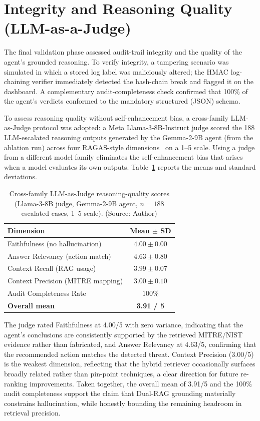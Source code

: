 \section{Integrity and Reasoning Quality (LLM-as-a-Judge)}
The final validation phase assessed audit-trail integrity and the quality of the agent's grounded reasoning. To verify integrity, a tampering scenario was simulated in which a stored log label was maliciously altered; the HMAC log-chaining verifier immediately detected the hash-chain break and flagged it on the dashboard. A complementary audit-completeness check confirmed that 100\% of the agent's verdicts conformed to the mandatory structured (JSON) schema.

To assess reasoning quality without self-enhancement bias, a cross-family LLM-as-Judge protocol \cite{zheng2023judge} was adopted: a Meta Llama-3-8B-Instruct judge scored the 188 LLM-escalated reasoning outputs generated by the Gemma-2-9B agent (from the ablation run) across four RAGAS-style dimensions~\cite{ragas2023} on a 1--5 scale. Using a judge from a different model family eliminates the self-enhancement bias that arises when a model evaluates its own outputs. Table~\ref{tab:ragas} reports the means and standard deviations.

\begin{table}[!htbp]
    \centering
    \caption{Cross-family LLM-as-Judge reasoning-quality scores (Llama-3-8B judge, Gemma-2-9B agent, $n = 188$ escalated cases, 1--5 scale). (Source: Author)}
    \label{tab:ragas}
    \begin{tabular}{|l|c|}
        \hline
        \textbf{Dimension} & \textbf{Mean $\pm$ SD} \\
        \hline
        Faithfulness (no hallucination) & $4.00 \pm 0.00$ \\
        \hline
        Answer Relevancy (action match) & $4.63 \pm 0.80$ \\
        \hline
        Context Recall (RAG usage) & $3.99 \pm 0.07$ \\
        \hline
        Context Precision (MITRE mapping) & $3.00 \pm 0.10$ \\
        \hline
        Audit Completeness Rate & $100\%$ \\
        \hline
        \textbf{Overall mean} & \textbf{3.91 / 5} \\
        \hline
    \end{tabular}
\end{table}

The judge rated Faithfulness at 4.00/5 with zero variance, indicating that the agent's conclusions are consistently supported by the retrieved MITRE/NIST evidence rather than fabricated, and Answer Relevancy at 4.63/5, confirming that the recommended action matches the detected threat. Context Precision (3.00/5) is the weakest dimension, reflecting that the hybrid retriever occasionally surfaces broadly related rather than pin-point techniques, a clear direction for future re-ranking improvements. Taken together, the overall mean of 3.91/5 and the 100\% audit completeness support the claim that Dual-RAG grounding materially constrains hallucination, while honestly bounding the remaining headroom in retrieval precision.

